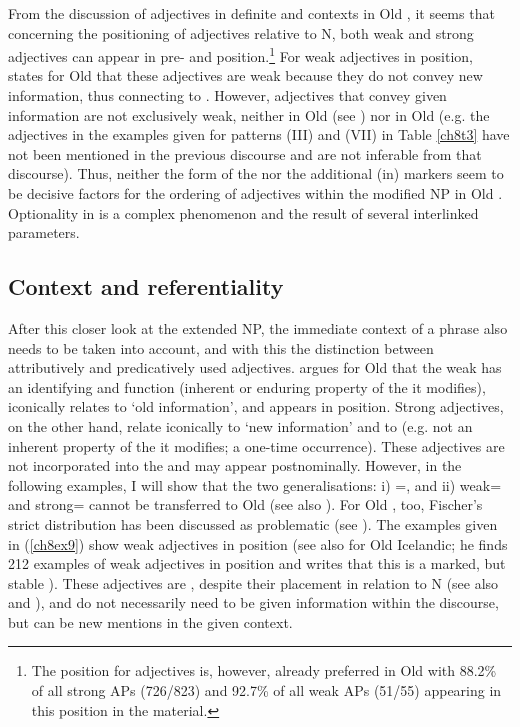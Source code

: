 \documentclass[output=paper,colorlinks,citecolor=brown]{langscibook}
\begin{document}
From the discussion of adjectives in definite and  contexts in
Old , it seems that concerning the positioning of adjectives
relative to N, both weak and strong adjectives can appear in pre- and
 position.\footnote{The  position for adjectives
  is, however, already preferred in Old  with 88.2\% of all
  strong APs (726/823) and 92.7\% of all weak APs (51/55)
  appearing in this position in the  material.} For weak
adjectives in  position, \citet[265f.]{Fischer01} states for Old
 that these adjectives are weak because they do not convey new
information, thus connecting  to . However, adjectives
that convey given information are not exclusively weak, neither in Old
 (see \citealp{Bech19}) nor in Old  (e.g. the adjectives in the
examples given for patterns (III) and (VII) in Table \ref{ch8t3} have not been
mentioned in the previous discourse and are not inferable from that discourse). Thus, neither the form of the  nor the
additional (in) markers seem to be decisive factors
for the ordering of adjectives within the modified NP in Old .
Optionality in  is a complex phenomenon and the result of
several interlinked parameters.


\subsection{Context and referentiality}\label{ch8s3.2}
After this closer look at the extended NP,  the immediate context of
a phrase also needs to be taken into account, and with this the distinction
between attributively and predicatively used adjectives. \citet{Fischer00,Fischer01} argues for Old  that the weak
 has an identifying and  function
(inherent or enduring property of the  it modifies), iconically
relates to `old information', and appears in  position. Strong
adjectives, on the other hand, relate iconically to `new information'
and to  (e.g. not an inherent property of the  it
modifies; a one-time occurrence). These adjectives are not incorporated
into the  and may appear postnominally. However, in the following
examples, I will show that the two generalisations: i)
=, and ii) weak= and strong=
cannot be transferred to Old  (see also \citealp[8]{Bech17}). For Old
, too, Fischer's strict distribution has been discussed as
problematic (see \citealp{Bech19}). The examples given in (\ref{ch8ex9}) show weak
adjectives in  position (see also \citealp[14]{Pfaff2019} for Old
Icelandic; he finds 212 examples of weak adjectives in 
position and writes that this is a marked, but stable ). These
adjectives are , despite their placement in relation to N
(see also \citealp[62]{Haumann10} and \citealp[vol. I, 75]{Mitchell85}), and do not
necessarily need to be given information within the discourse, but can
be new mentions in the given context.\largerpage[-1]
\end{document}
